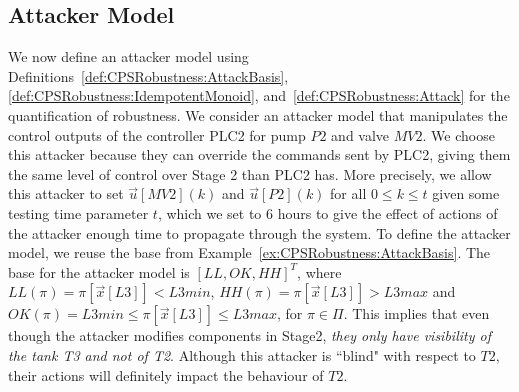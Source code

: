 {{%

\subsection{Attacker Model}%
We now define an attacker model using Definitions~\ref{def:CPSRobustness:AttackBasis}, \ref{def:CPSRobustness:IdempotentMonoid}, and~\ref{def:CPSRobustness:Attack} for the quantification of robustness. We consider an attacker model that manipulates the control outputs of the controller PLC2 for pump $P2$ and valve $MV2$. We choose this attacker because they can override the commands sent by PLC2, giving them the same level of control over Stage 2 than PLC2 has. More precisely, we allow this attacker to set $\vec{u}[MV2](k)$ and $\vec{u}[P2](k)$ for all $0\leq k\leq t$ given some testing time parameter $t$, which we set to 6 hours to give the effect of actions of the attacker enough time to propagate through the system. To define the attacker model, we reuse the base from Example~\ref{ex:CPSRobustness:AttackBasis}. The base for the attacker model is $[LL, OK, HH]^T$, where ${LL}(\pi)=\pi[\vec{x}[L3]]<L3min$, ${HH}(\pi)=\pi[\vec{x}[L3]]>L3max$ and ${OK}(\pi)=L3min \leq \pi[\vec{x}[L3]]\leq L3max$, for $\pi \in \Pi$. This implies that even though the attacker modifies components in Stage2, \emph{they only have visibility of the tank T3 and not of T2}. Although this attacker is ``blind" with respect to $T2$, their actions will definitely impact the behaviour of $T2$. 

}}
